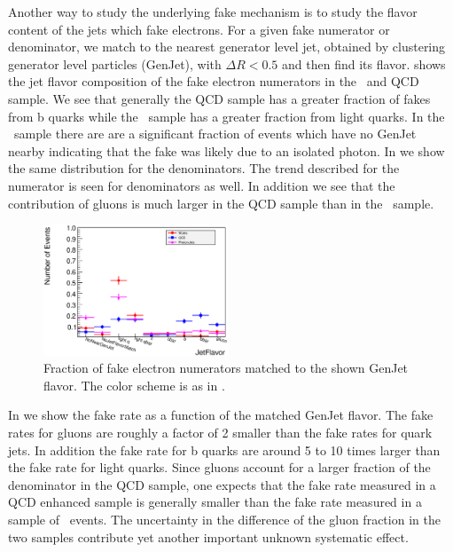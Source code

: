\documentclass{cmspaper}
\begin{document}
Another way to study the underlying fake mechanism is to study the flavor content of the jets which fake electrons. For a given fake numerator or denominator, we match to the nearest generator level jet, obtained by clustering generator level particles (GenJet), with $\Delta R < 0.5$ and then find its flavor.  shows the jet flavor composition of the fake electron numerators in the \WPlusJets\ and QCD sample. We see that generally the QCD sample has a greater fraction of fakes from b quarks while the \WPlusJets\ sample has a greater fraction from light quarks. In the \WPlusJets\ sample there are are a significant fraction of events which have no GenJet nearby indicating that the fake was likely due to an isolated photon. In  we show the same distribution for the denominators. The trend described for the numerator is seen for denominators as well. In addition we see that the contribution of gluons is much larger in the QCD sample than in the \WPlusJets\ sample. 

\begin{figure}[htb]
\begin{center}
\includegraphics[width=0.49\textwidth]{plots/ElectronNumeratorJetFlavor_Madgraph_WJetsVsQCD.eps}
   \caption{Fraction of fake electron numerators matched to the shown GenJet flavor. The color scheme is as in . }
   \label{fig:ElectronNumerator_JetFlavor}
\end{center}
\end{figure}

In  we show the fake rate as a function of the matched GenJet flavor. The fake rates for gluons are roughly a factor of 2 smaller than the fake rates for quark jets. In addition the fake rate for b quarks are around 5 to 10 times larger than the fake rate for light quarks. Since gluons account for a larger fraction of the denominator in the QCD sample, one expects that the fake rate measured in a QCD enhanced sample is generally smaller than the fake rate measured in a sample of \WPlusJets\ events. The uncertainty in the difference of the gluon fraction in the two samples contribute yet another important unknown systematic effect.    
\end{document}
